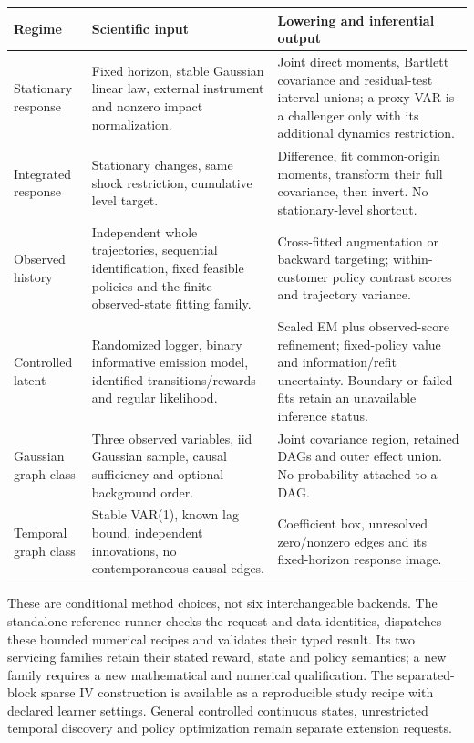 \begin{longtable}{P{.13\textwidth}P{.38\textwidth}P{.42\textwidth}}
\toprule Regime & Scientific input & Lowering and inferential output\\\midrule\endhead
Stationary response & Fixed horizon, stable Gaussian linear law, external
instrument and nonzero impact normalization. & Joint direct moments,
Bartlett covariance and residual-test interval unions; a proxy VAR is a
challenger only with its additional dynamics restriction.\\
Integrated response & Stationary changes, same shock restriction, cumulative
level target. & Difference, fit common-origin moments, transform their full
covariance, then invert. No stationary-level shortcut.\\
Observed history & Independent whole trajectories, sequential identification,
fixed feasible policies and the finite observed-state fitting family. &
Cross-fitted augmentation or backward targeting; within-customer policy
contrast scores and trajectory variance.\\
Controlled latent & Randomized logger, binary informative emission model,
identified transitions/rewards and regular likelihood. & Scaled EM plus
observed-score refinement; fixed-policy value and information/refit uncertainty.
Boundary or failed fits retain an unavailable inference status.\\
Gaussian graph class & Three observed variables, iid Gaussian sample,
causal sufficiency and optional background order. & Joint covariance region,
retained DAGs and outer effect union. No probability attached to a DAG.\\
Temporal graph class & Stable VAR(1), known lag bound, independent innovations,
no contemporaneous causal edges. & Coefficient box, unresolved zero/nonzero
edges and its fixed-horizon response image.\\\bottomrule
\end{longtable}

These are conditional method choices, not six interchangeable backends.
The standalone reference runner checks the request and data identities,
dispatches these bounded numerical recipes and validates their typed result.
Its two servicing families retain their stated reward, state and policy
semantics; a new family requires a new mathematical and numerical qualification.
The separated-block sparse IV construction is available as a reproducible
study recipe with declared learner settings. General controlled continuous
states, unrestricted temporal discovery and policy optimization remain
separate extension requests.

